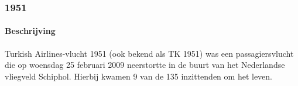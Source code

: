 \documentclass{article}
\begin{document}
	\subsubsection{1951}
	\paragraph{Beschrijving}
	Turkish Airlines-vlucht 1951 (ook bekend als TK 1951) was een passagiersvlucht die op woensdag 25 februari 2009 neerstortte in de buurt van het Nederlandse vliegveld Schiphol. Hierbij kwamen 9 van de 135 inzittenden om het leven.
	
\end{document}
